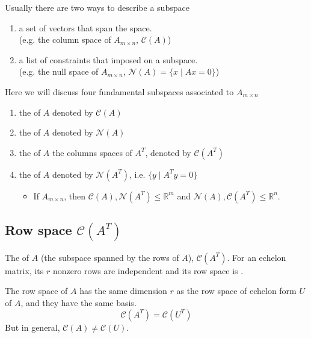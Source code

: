Usually there are two ways to describe a subspace
\begin{enumerate}[label=(\roman*)]
    \item a set of vectors that span the space. \\
    (e.g. the column space of $A_{m \times n}$, $\mathcal{C}(A)$)
    \item a list of constraints that imposed on a subspace. \\
    (e.g. the null space of $A_{m \times n}$, $\mathcal{N}(A) = \{x \mid Ax = 0\}$)
\end{enumerate}
Here we will discuss four fundamental subspaces associated to $A_{m \times n}$
\begin{enumerate}[label=(\arabic*)]
    \item the  of $A$ denoted by $\mathcal{C}(A)$
    \item the  of $A$ denoted by $\mathcal{N}(A)$
    \item the  of $A$ the columns spaces of $A^T$, denoted by $\mathcal{C}(A^T)$
    \item the  of $A$ denoted by $\mathcal{N}(A^T)$, i.e. $\{y \mid A^T y = 0\}$
    \begin{itemize}
        \item If $A_{m\times n}$, then $\mathcal{C}(A), \mathcal{N}(A^T) \leq \mathbb{R}^m$ and $\mathcal{N}(A), \mathcal{C}(A^T) \leq \mathbb{R}^n$.
    \end{itemize}
\end{enumerate}

\subsection{Row space $\mathcal{C}(A^T)$}

The  of $A$ (the subspace spanned by the rows of $A$), $\mathcal{C}(A^T)$. For an echelon matrix, its $r$ nonzero rows are independent and its row space is .

\begin{proposition}[2M]
    The row space of $A$ has the same dimension $r$ as the row space of echelon form $U$ of $A$, and they have the same basis.
    \[
        \mathcal{C}(A^T) = \mathcal{C}(U^T)
    \]
    But in general, $\mathcal{C}(A) \neq \mathcal{C}(U)$.
\end{proposition}

